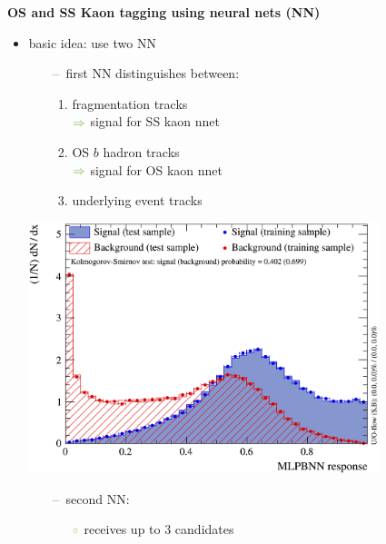 {\begin{minipage}{0.474\boxwidth}
\begin{itemize}
\end{itemize}
\end{minipage}
\vspace{0.1em}
\hfill
\begin{minipage}{0.474\boxwidth}
\textbf{OS and SS Kaon tagging using neural nets (NN)}
\vspace{-0.1em}
\begin{itemize}
\item basic idea: use two NN
\begin{itemize}
\setlength\itemsep{0.01em}
\setlength{\itemindent}{-.11in}
\item[${\color{tu_gruen}-}$] first NN distinguishes between:
\begin{enumerate}
\item fragmentation tracks\\
${\color{tu_gruen}\Rightarrow}$ signal for SS kaon nnet
\item OS $b$ hadron tracks\\
${\color{tu_gruen}\Rightarrow}$ signal for OS kaon nnet
\item underlying event tracks 
\end{enumerate}
\end{itemize}
\vspace{-1.7em}
\begin{center}
\includegraphics[width=0.802\textwidth]{figures/sskaonNnetfirstNN3.png}
\end{center}
\vspace{-2.5em}
\setlength\itemsep{0.01em}
\setlength{\itemindent}{-.11in}
\begin{itemize}
\setlength{\itemindent}{-.11in}
\item[${\color{tu_gruen}-}$] second NN:
\begin{itemize}
\item[${\color{tu_gruen}\circ}$] receives up to 3 candidates 

\end{itemize}
\end{itemize}
\end{itemize}
\end{minipage}}
